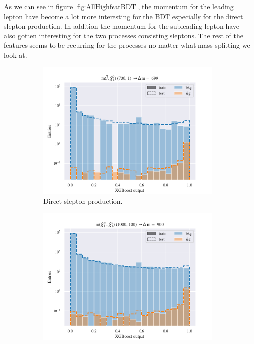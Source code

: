 As we can see in figure \ref{fig:AllHighfeatBDT}, the momentum for the leading lepton have become a lot more interesting for the BDT especially for the direct slepton production. In addition the momentum for the subleading lepton have also gotten interesting for the two processes consisting sleptons. The rest of the features seems to be recurring for the processes no matter what mass splitting we look at. 



\begin{figure}[H]
    \centering
    \begin{subfigure}[t!]{0.49\textwidth}
        \includegraphics[width = \textwidth]{Figures/SlepSlep/ML/BDT/Low_level/High/scaled_train_test_396033.pdf}
        \caption{Direct slepton production.}
        \label{fig:SlepslepHigh}
    \end{subfigure}
    \begin{subfigure}[t!]{0.49\textwidth}
        \includegraphics[width = \textwidth]{Figures/SlepSnu/BDT/Low_level/High/scaled_train_test_397169.pdf}

\end{subfigure}
\end{figure}
